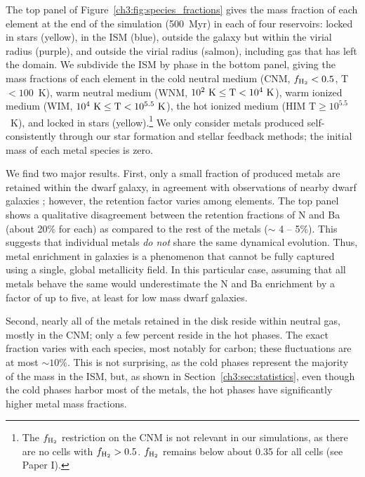 The top panel of Figure~\ref{ch3:fig:species_fractions} gives the mass fraction of each element at the end of the simulation (500~Myr) in each of four reservoirs: locked in stars (yellow), in the ISM (blue), outside the galaxy but within the virial radius (purple), and outside the virial radius (salmon), including gas that has left the domain. We subdivide the ISM by phase in the bottom panel, giving the mass fractions of each element in the cold neutral medium (CNM, $f_{\rm H_2} < 0.5$,  T$< 100$~K), warm neutral medium (WNM, $10^2~\rm{K}\le \rm{T} < 10^4~\rm{K}$), warm ionized medium (WIM, $10^4~\rm{K}\le \rm{T} < 10^{5.5}~\rm{K}$), the hot ionized medium (HIM T$\ge 10^{5.5}$~K), and locked in stars (yellow).\footnote{The $f_{\rm H_2}$ restriction on the CNM is not relevant in our simulations, as there are no cells with $f_{\rm H_2} > 0.5$. $f_{\rm H_2}$ remains below about 0.35 for all cells (see Paper I).}
    We
only consider metals produced self-consistently through our star formation and stellar feedback methods; the initial mass of each metal species is zero.

We find two major results.
    First,
only a small fraction of produced metals are retained within the dwarf galaxy, in agreement with observations of nearby dwarf galaxies \citep[see][]{Kirby2011-metals, McQuinn2015}; however, the retention factor varies
    among elements. The top panel shows a qualitative disagreement between the retention fractions of N and Ba (about 20\% for each) as compared to the rest of the metals ($\sim$ 4 -- 5\%). This suggests that individual metals \textit{do not} share the same dynamical evolution.
       Thus,
metal enrichment in galaxies is a phenomenon that cannot be fully captured using a single, global metallicity field. In this particular case, assuming that all metals behave the same would underestimate the N and Ba enrichment by a factor of up to five, at least for low mass dwarf galaxies.

    Second,
nearly all of the metals
    retained in the disk
reside within neutral gas, mostly in the CNM; only a few percent
reside in the hot phases. The exact fraction varies with each species, most notably for carbon; these fluctuations are at most $\sim 10$\%. This is not surprising, as the cold phases represent the majority of the mass in the ISM, but, as shown in Section~\ref{ch3:sec:statistics}, even though the cold phases harbor most of the metals, the hot phases have significantly higher metal mass fractions.

